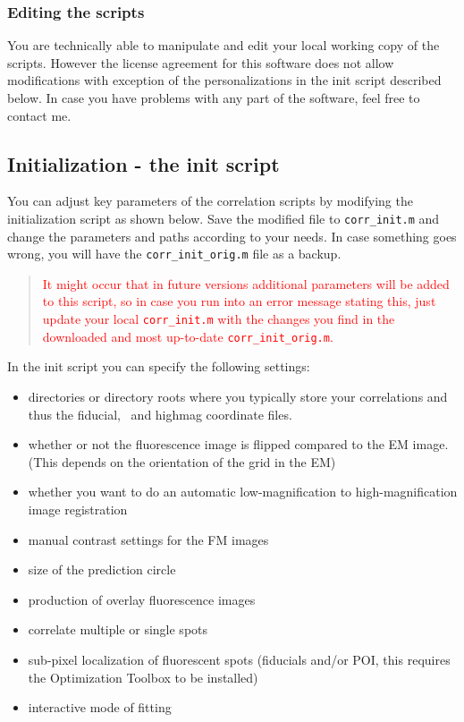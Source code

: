 \documentclass[10pt,a4paper,onepage,DIV12]{scrartcl}
\begin{document}
\subsubsection*{Editing the scripts}
You are technically able to manipulate and edit your local working copy of the scripts. However the license agreement for this software does not allow modifications with exception of the personalizations in the init script described below. In case you have problems with any part of the software, feel free to contact me.


 \newpage
\subsection{Initialization - the init script}
\label{sec:init}
You can adjust key parameters of the correlation scripts by modifying the initialization script as shown below. Save the modified file to \texttt{corr\_init.m} and change the parameters and paths according to your needs. In case something goes wrong, you will have the \texttt{corr\_init\_orig.m} file as a backup.

\begin{quote}\textcolor{red}{
   It might occur that in future versions additional parameters will be added to this script, so in case you run into an error message stating this, just update your local \texttt{corr\_init.m} with the changes you find in the downloaded and most up-to-date \texttt{corr\_init\_orig.m}.}
 \end{quote}

In the init script you can specify the following settings:
\begin{itemize}
 \item directories or directory roots where you typically store your correlations and thus the fiducial, \ and highmag coordinate files.
 \item whether or not the fluorescence image is flipped compared to the EM image. (This depends on the orientation of the grid in the EM)
 \item whether you want to do an automatic low-magnification to high-magnification image registration
 \item manual contrast settings for the FM images
 \item size of the prediction circle
 \item production of overlay fluorescence images
 \item correlate multiple or single spots
 \item sub-pixel localization of fluorescent spots (fiducials and/or POI, this requires the Optimization Toolbox to be installed)
 \item interactive mode of fitting
\end{itemize}
\end{document}
